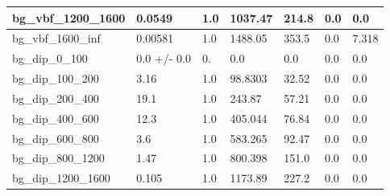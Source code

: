 \documentclass[a4paper, 10pt]{article}
\begin{document}
\begin{table}[H]
\begin{center}
\begin{tabular}{|m{23.0mm}|m{23.0mm}|m{18.0mm}|m{19.0mm}|m{19.0mm}|m{19.0mm}|m{19.0mm}|}
      \hline
      {\cellcolor{white}         bg\_vbf\_1200\_1600}& {\cellcolor{white}         0.0549}& {\cellcolor{white}         1.0}& {\cellcolor{white}         1037.47}& {\cellcolor{white}         214.8}& {\cellcolor{green}         0.0}& {\cellcolor{green}         0.0}\\
      \hline
      {\cellcolor{white}         bg\_vbf\_1600\_inf}& {\cellcolor{white}         0.00581}& {\cellcolor{white}         1.0}& {\cellcolor{white}         1488.05}& {\cellcolor{white}         353.5}& {\cellcolor{orange}         0.0}& {\cellcolor{orange}         7.318}\\
      \hline
      {\cellcolor{white}         bg\_dip\_0\_100}& {\cellcolor{white}         0.0 +/\-- 0.0}& {\cellcolor{white}         0.}& {\cellcolor{white}         0.0}& {\cellcolor{white}         0.0}& {\cellcolor{green}         0.0}& {\cellcolor{green}         0.0}\\
      \hline
      {\cellcolor{white}         bg\_dip\_100\_200}& {\cellcolor{white}         3.16}& {\cellcolor{white}         1.0}& {\cellcolor{white}         98.8303}& {\cellcolor{white}         32.52}& {\cellcolor{green}         0.0}& {\cellcolor{green}         0.0}\\
      \hline
      {\cellcolor{white}         bg\_dip\_200\_400}& {\cellcolor{white}         19.1}& {\cellcolor{white}         1.0}& {\cellcolor{white}         243.87}& {\cellcolor{white}         57.21}& {\cellcolor{green}         0.0}& {\cellcolor{green}         0.0}\\
      \hline
      {\cellcolor{white}         bg\_dip\_400\_600}& {\cellcolor{white}         12.3}& {\cellcolor{white}         1.0}& {\cellcolor{white}         405.044}& {\cellcolor{white}         76.84}& {\cellcolor{green}         0.0}& {\cellcolor{green}         0.0}\\
      \hline
      {\cellcolor{white}         bg\_dip\_600\_800}& {\cellcolor{white}         3.6}& {\cellcolor{white}         1.0}& {\cellcolor{white}         583.265}& {\cellcolor{white}         92.47}& {\cellcolor{green}         0.0}& {\cellcolor{green}         0.0}\\
      \hline
      {\cellcolor{white}         bg\_dip\_800\_1200}& {\cellcolor{white}         1.47}& {\cellcolor{white}         1.0}& {\cellcolor{white}         800.398}& {\cellcolor{white}         151.0}& {\cellcolor{green}         0.0}& {\cellcolor{green}         0.0}\\
      \hline
      {\cellcolor{white}         bg\_dip\_1200\_1600}& {\cellcolor{white}         0.105}& {\cellcolor{white}         1.0}& {\cellcolor{white}         1173.89}& {\cellcolor{white}         227.2}& {\cellcolor{green}         0.0}& {\cellcolor{green}         0.0}\\

\end{tabular}
\end{center}
\end{table}
\end{document}

